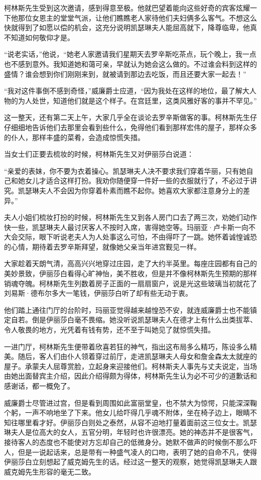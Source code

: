 \par 柯林斯先生受到这次邀请，感到得意至极。他就巴望着能向这些好奇的宾客炫耀一下他那位女恩主的堂堂气派，让他们瞧瞧老人家待他们夫妇俩多么客气。不想这么快就得到了如愿以偿的机会，这充分说明凯瑟琳夫人能屈高就下，降尊临卑，他真不知道如何敬仰才是。
\par “说老实话，”他说，“她老人家邀请我们星期天去罗辛斯吃茶点，玩个晚上，我一点也不感到意外。我知道她和蔼可亲，早就认为她会这么做的。不过谁会料到这样的盛情？谁会想到你们刚刚来到，就被请到那边去吃饭，而且还要大家一起去！”
\par “我对这件事倒不感到奇怪，”威廉爵士应道，“因为我处在这样的地位，最了解大人物的为人处世，知道他们就是这个样子。在宫廷里，这类风雅好客的事并不罕见。”
\par 这一整天，还有第二天上午，大家几乎全在谈论去罗辛斯做客的事。柯林斯先生仔仔细细地告诉他们去那里会看到些什么，免得他们看到那样宏伟的屋子，那样众多的仆人，那样丰盛的菜肴，会造成惊慌失措。
\par 当女士们正要去梳妆的时候，柯林斯先生又对伊丽莎白说道：
\par “亲爱的表妹，你不要为衣着操心。凯瑟琳夫人决不要求我们穿着华丽，只有她自己和她女儿才适合这样打扮。我劝你随便穿一件好一些的衣服就行了，不必过于讲究。凯瑟琳夫人不会因为你穿着朴素而瞧不起你。她喜欢大家都注意身分上的差异。”
\par 夫人小姐们梳妆打扮的时候，柯林斯先生又到各人房门口去了两三次，劝她们动作快一些，凯瑟琳夫人最讨厌客人不按时入席，害得她空等。玛丽亚·卢卡斯一向不大会交际，眼下听说老夫人为人处事这么可怕，不由得吓了一跳。她怀着诚惶诚恐的心情，期待着去罗辛斯拜望，就像她父亲当年进宫觐见一样。
\par 大家趁着天朗气清，高高兴兴地穿过庄园，走了大约半英里。每座庄园都有自己的美妙景致，伊丽莎白看得心旷神怡，美不胜收，但是并不像柯林斯先生预期的那样销魂夺魄。柯林斯先生列数着房子正面的一扇扇窗户，说是光这些玻璃当初就花了刘易斯·德布尔多大一笔钱，伊丽莎白听了却有些无动于衷。
\par 他们踏上通往门厅的台阶时，玛丽亚觉得越来越惶恐不安，就连威廉爵士也不能镇定自若。倒是伊丽莎白毫不畏缩。她没听说凯瑟琳夫人在德才上有什么出类拔萃、令人敬畏的地方，光凭着有钱有势，还不至于叫她见了就惊慌失措。
\par 一进门厅，柯林斯先生便带着欣喜若狂的神气，指出这布局多么精巧，陈设多么精美。随后，客人们由仆人领着穿过前厅，走进凯瑟琳夫人母女和詹金森太太就座的屋子。承蒙夫人屈尊赏脸，立起身来迎接他们。柯林斯夫人事先与丈夫说定，当场由她出面替宾主介绍，因此介绍得颇为得体，柯林斯先生认为必不可少的道歉话和感谢话，都一概免了。
\par 威廉爵士尽管进过宫，但是看到周围如此富丽堂皇，也不禁大为惊愕，只能深深鞠个躬，一声不响地坐了下来。他女儿给吓得几乎魂不附体，坐在椅子边上，眼睛不知往哪里看才好。伊丽莎白则处之泰然，从容不迫地打量着面前这三位女士。凯瑟琳夫人是位高大的女人，五官分明，年轻时也许很漂亮。她的神态并不是很客气，接待客人的态度也不能使对方忘却自己的低微身分。她默不做声的时候倒不那么吓人，但是一说起话来，总是带有一种盛气凌人的口吻，表明了她的自命不凡，使得伊丽莎白立刻想起了威克姆先生的话。经过这一整天的观察，她觉得凯瑟琳夫人跟威克姆先生形容的毫无二致。
